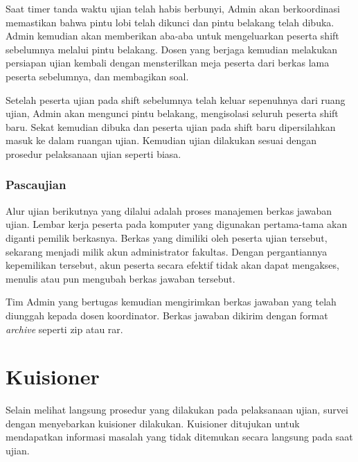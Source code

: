         Saat timer tanda waktu ujian telah habis berbunyi, Admin akan
        berkoordinasi memastikan bahwa pintu lobi telah dikunci dan pintu
        belakang telah dibuka. Admin kemudian akan memberikan aba-aba untuk
        mengeluarkan peserta shift sebelumnya melalui pintu belakang. Dosen yang
        berjaga kemudian melakukan persiapan ujian kembali dengan mensterilkan
        meja peserta dari berkas lama peserta sebelumnya, dan membagikan soal.
        
        Setelah peserta ujian pada shift sebelumnya telah keluar sepenuhnya dari
        ruang ujian, Admin akan mengunci pintu belakang, mengisolasi seluruh
        peserta shift baru. Sekat kemudian dibuka dan peserta ujian pada shift
        baru dipersilahkan masuk ke dalam ruangan ujian. Kemudian ujian
        dilakukan sesuai dengan prosedur pelaksanaan ujian seperti biasa.
    
    \subsubsection{Pascaujian}
        Alur ujian berikutnya yang dilalui adalah proses manajemen berkas
        jawaban ujian. Lembar kerja peserta pada komputer yang digunakan
        pertama-tama akan diganti pemilik berkasnya. Berkas yang dimiliki oleh
        peserta ujian tersebut, sekarang menjadi milik akun administrator
        fakultas. Dengan pergantiannya kepemilikan tersebut, akun peserta secara
        efektif tidak akan dapat mengakses, menulis atau pun mengubah berkas
        jawaban tersebut.
        
        Tim Admin yang bertugas kemudian mengirimkan berkas jawaban yang telah
        diunggah kepada dosen koordinator. Berkas jawaban dikirim dengan format
        \textit{archive} seperti zip atau rar.
    
\section{Kuisioner}
    Selain melihat langsung prosedur yang dilakukan pada pelaksanaan ujian,
    survei dengan menyebarkan kuisioner dilakukan. Kuisioner ditujukan untuk
    mendapatkan informasi masalah yang tidak ditemukan secara langsung pada saat
    ujian.
    
